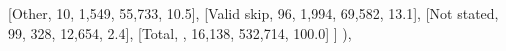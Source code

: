 \documentclass[
  11pt,
  a4paper,
]{article}
\newenvironment{Shaded}{\begin{snugshade}}{\end{snugshade}}
\newcommand{\NormalTok}[1]{\textcolor[rgb]{0.00,0.23,0.31}{#1}}
\newcommand{\StringTok}[1]{\textcolor[rgb]{0.13,0.47,0.30}{#1}}
\begin{document}
\begin{Shaded}
\begin{Highlighting}[]
\NormalTok{                    [}\StringTok{\textquotesingle{}Other\textquotesingle{}}\NormalTok{, }\StringTok{\textquotesingle{}10\textquotesingle{}}\NormalTok{, }\StringTok{\textquotesingle{}1,549\textquotesingle{}}\NormalTok{, }\StringTok{\textquotesingle{}55,733\textquotesingle{}}\NormalTok{, }\StringTok{\textquotesingle{}10.5\textquotesingle{}}\NormalTok{],}
\NormalTok{                    [}\StringTok{\textquotesingle{}Valid skip\textquotesingle{}}\NormalTok{, }\StringTok{\textquotesingle{}96\textquotesingle{}}\NormalTok{, }\StringTok{\textquotesingle{}1,994\textquotesingle{}}\NormalTok{, }\StringTok{\textquotesingle{}69,582\textquotesingle{}}\NormalTok{, }\StringTok{\textquotesingle{}13.1\textquotesingle{}}\NormalTok{],}
\NormalTok{                    [}\StringTok{\textquotesingle{}Not stated\textquotesingle{}}\NormalTok{, }\StringTok{\textquotesingle{}99\textquotesingle{}}\NormalTok{, }\StringTok{\textquotesingle{}328\textquotesingle{}}\NormalTok{, }\StringTok{\textquotesingle{}12,654\textquotesingle{}}\NormalTok{, }\StringTok{\textquotesingle{}2.4\textquotesingle{}}\NormalTok{],}
\NormalTok{                    [}\StringTok{\textquotesingle{}Total\textquotesingle{}}\NormalTok{, }\StringTok{\textquotesingle{}\textquotesingle{}}\NormalTok{, }\StringTok{\textquotesingle{}16,138\textquotesingle{}}\NormalTok{, }\StringTok{\textquotesingle{}532,714\textquotesingle{}}\NormalTok{, }\StringTok{\textquotesingle{}100.0\textquotesingle{}}\NormalTok{]}
\NormalTok{                ]}
\NormalTok{            ),}
            

\end{Highlighting}
\end{Shaded}
\end{document}
